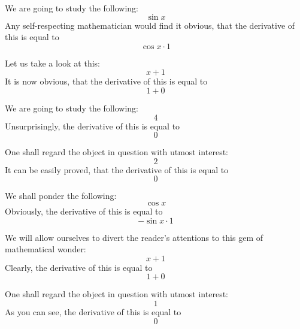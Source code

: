 \documentclass{article}
\begin{document}
We are going to study the following:
\begin{equation}
\sin x 
\end{equation}
Any self-respecting mathematician would find it obvious, that the derivative of this is equal to
\begin{equation}
\cos x \cdot 1 
\end{equation}

Let us take a look at this:
\begin{equation}
x + 1 
\end{equation}
It is now obvious, that the derivative of this is equal to
\begin{equation}
1 + 0 
\end{equation}

We are going to study the following:
\begin{equation}
4 
\end{equation}
Unsurprisingly, the derivative of this is equal to
\begin{equation}
0 
\end{equation}

One shall regard the object in question with utmost interest:
\begin{equation}
2 
\end{equation}
It can be easily proved, that the derivative of this is equal to
\begin{equation}
0 
\end{equation}

We shall ponder the following:
\begin{equation}
\cos x 
\end{equation}
Obviously, the derivative of this is equal to
\begin{equation}
-\sin x \cdot 1 
\end{equation}

We will allow ourselves to divert the reader's attentions to this gem of mathematical wonder:
\begin{equation}
x + 1 
\end{equation}
Clearly, the derivative of this is equal to
\begin{equation}
1 + 0 
\end{equation}

One shall regard the object in question with utmost interest:
\begin{equation}
1 
\end{equation}
As you can see, the derivative of this is equal to
\begin{equation}
0 
\end{equation}
\end{document}
